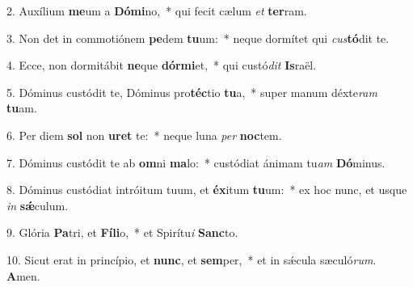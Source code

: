 2. Auxílium \textbf{me}um a \textbf{Dó}\textbf{mi}no,~*  qui fecit cælum \textit{et} \textbf{ter}ram.\

3. Non det in commotiónem \textbf{pe}dem \textbf{tu}um:~*  neque dormítet qui \textit{cus}\textbf{tó}dit te.\

4. Ecce, non dormitábit \textbf{ne}que \textbf{dór}\textbf{mi}et,~*  qui custó\textit{dit} \textbf{Is}raël.\

5. Dóminus custódit te, Dóminus pro\textbf{téc}tio \textbf{tu}a,~*  super manum déxte\textit{ram} \textbf{tu}am.\

6. Per diem \textbf{sol} non \textbf{u}\textbf{ret} te:~*  neque luna \textit{per} \textbf{noc}tem.\

7. Dóminus custódit te ab \textbf{om}ni \textbf{ma}lo:~*  custódiat ánimam tu\textit{am} \textbf{Dó}minus.\

8. Dóminus custódiat intróitum tuum, et \textbf{éx}itum \textbf{tu}um:~*  ex hoc nunc, et usque \textit{in} \textbf{sǽ}culum.\

9. Glória \textbf{Pa}tri, et \textbf{Fí}\textbf{li}o,~*  et Spirítu\textit{i} \textbf{Sanc}to.\

10. Sicut erat in princípio, et \textbf{nunc}, et \textbf{sem}per,~*  et in sǽcula sæculó\textit{rum}. \textbf{A}men.\

